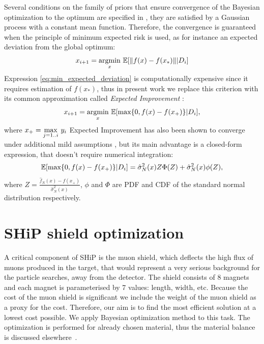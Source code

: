 \documentclass[a4paper]{jpconf}
\theoremstyle{my_theorem_style}
\numberwithin{equation}{section}
\begin{document}
Several conditions on the family of priors that ensure convergence of the Bayesian optimization to the optimum are specified in \cite{Mockus1994}, they are satisfied by a Gaussian process with a constant mean function. Therefore, the convergence is guaranteed when the principle of minimum expected risk is used, as for instance an expected deviation from the global optimum:
\begin{equation}
\label{eq:min_expected_deviation}
x_{i + 1} = \underset{x}{\textup{argmin}}\ \mathbb{E}[\|f(x) - f(x_*)\|  | D_i]
\end{equation}
Expression \ref{eq:min_expected_deviation} is computationally expensive since it requires estimation of $f(x_*)$, thus in present work we replace this criterion with its common approximation called \emph{Expected Improvement} \cite{Mockus1978}:
\begin{equation}
\label{EI}
x_{i + 1} = \underset{x}{\textup{argmin}}\ \mathbb{E}[\textup{max}\{0, f(x) - f(x_+)\}  | D_i],
\end{equation} 
where $x_+ = \underset{j = 1..i}{\textup{max}}\ y_i$
Expected Improvement has also been shown to converge under additional mild assumptions \cite{vazquez2010convergence}, but its main advantage is a closed-form expression, that doesn't require numerical integration:
\begin{equation}
\label{EI:closed_form}
\mathbb{E}[\textup{max}\{0, f(x) - f(x_+)\}  | D_i] = \hat{\sigma}_N^2(x) Z \Phi(Z) + \hat{\sigma}_N^2(x) \phi(Z),
\end{equation}
where $Z = \frac{\hat{f}_N(x) - f(x_+)}{\hat{\sigma}_N^2(x)}$, $\phi$ and $\Phi$ are PDF and CDF of the standard normal distribution respectively.


\section{SHiP shield optimization}

A critical component of SHiP is the muon shield, which deflects the
high flux of muons produced in the target, that would represent a very
serious  background for the particle searches, away from the
detector. The shield consists of 8 magnets and each magnet is
parameterised by 7 values: length, width, etc. Because the cost of the
muon shield is significant we include the weight of the muon shield as
a proxy for the cost. Therefore, our aim is to find the most efficient
solution at a lowest cost possible. We apply Bayesian optimization
method to this task. The optimization is performed for already chosen material, thus the material balance is discussed elsewhere~\cite{Akmete:2017bpl}.
\end{document}
